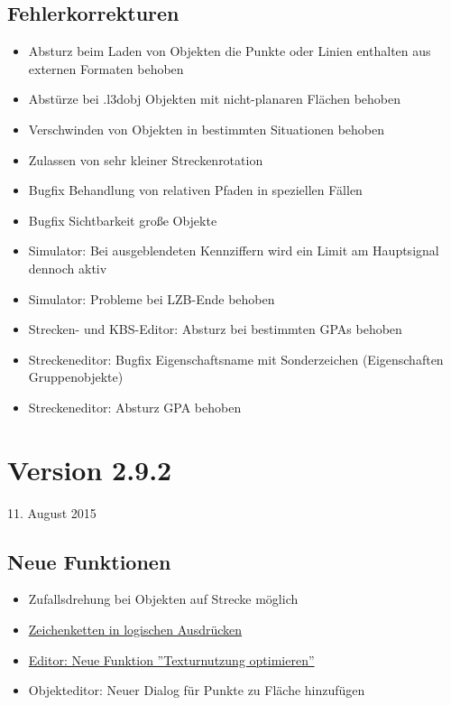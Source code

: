 \subsection{Fehlerkorrekturen}
\begin{itemize}
\item Absturz beim Laden von Objekten die Punkte oder Linien enthalten aus externen Formaten behoben
\item Abstürze bei .l3dobj Objekten mit nicht-planaren Flächen behoben
\item Verschwinden von Objekten in bestimmten Situationen behoben
\item Zulassen von sehr kleiner Streckenrotation
\item Bugfix Behandlung von relativen Pfaden in speziellen Fällen
\item Bugfix Sichtbarkeit große Objekte 
\item Simulator: Bei ausgeblendeten Kennziffern wird ein Limit am Hauptsignal dennoch aktiv
\item Simulator: Probleme bei LZB-Ende behoben
\item Strecken- und KBS-Editor: Absturz bei bestimmten GPAs behoben
\item Streckeneditor: Bugfix Eigenschaftsname mit Sonderzeichen (Eigenschaften Gruppenobjekte)
\item Streckeneditor: Absturz GPA behoben
\end{itemize}


\section{Version 2.9.2}\hfill 11. August 2015
\subsection{Neue Funktionen}
\begin{itemize}
\item Zufallsdrehung bei Objekten auf Strecke möglich
\item \hyperref[sec.editor.obj.logischeausdruecke]{Zeichenketten in logischen Ausdrücken}
\item \hyperref[sec:editor-texturnutzung-optimieren]{Editor: Neue Funktion ''Texturnutzung optimieren''}
\item Objekteditor: Neuer Dialog für Punkte zu Fläche hinzufügen
\end{itemize}

